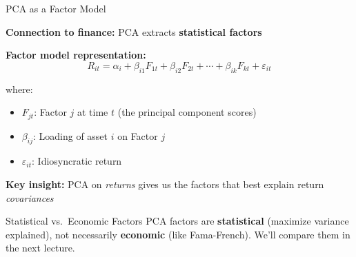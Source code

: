\documentclass[10pt]{beamer}
\newcommand{\highlight}[1]{\textcolor{AccentOrange}{\textbf{#1}}}
\begin{document}
\begin{frame}{PCA as a Factor Model}

  \textbf{Connection to finance:} PCA extracts \highlight{statistical factors}

  \vspace{1em}
  \textbf{Factor model representation:}
  \[
  R_{it} = \alpha_i + \beta_{i1} F_{1t} + \beta_{i2} F_{2t} + \cdots + \beta_{ik} F_{kt} + \varepsilon_{it}
  \]

  where:
  \begin{itemize}
    \item $F_{jt}$: Factor $j$ at time $t$ (the principal component scores)
    \item $\beta_{ij}$: Loading of asset $i$ on Factor $j$
    \item $\varepsilon_{it}$: Idiosyncratic return
  \end{itemize}

  \vspace{1em}
  \textbf{Key insight:} PCA on \emph{returns} gives us the factors that best explain return \emph{covariances}

  \vspace{0.5em}
  \begin{block}{Statistical vs.\ Economic Factors}
    PCA factors are \highlight{statistical} (maximize variance explained), not necessarily \highlight{economic} (like Fama-French). We'll compare them in the next lecture.
  \end{block}
\end{frame}

\end{document}
